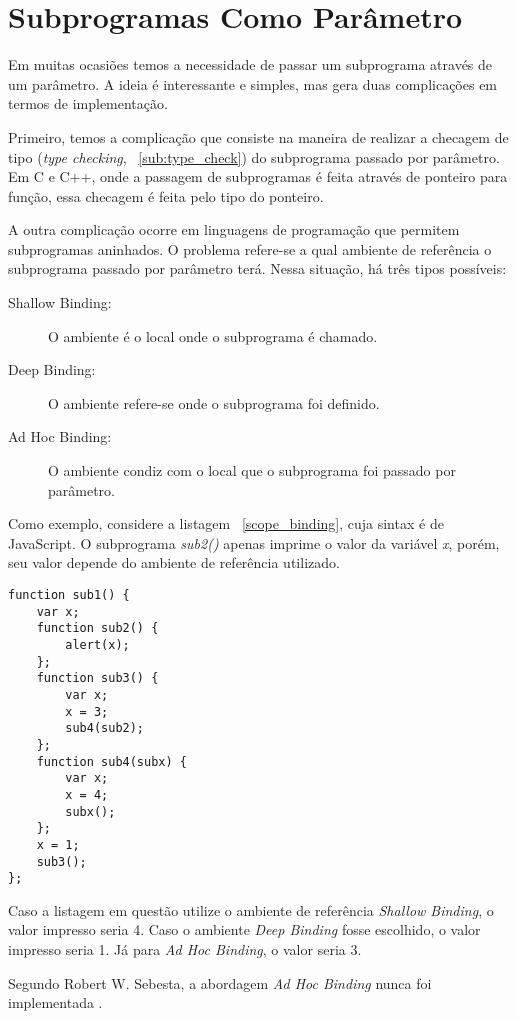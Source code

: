 
\section{Subprogramas Como Parâmetro} %
\label{sec:subprogramas_como_parametro}
Em muitas ocasiões temos a necessidade de passar um subprograma através de um parâmetro. A ideia é interessante e simples, mas gera duas complicações em termos de implementação.

Primeiro, temos a complicação que consiste na maneira de realizar a checagem de tipo (\textit{type checking}, ~\ref{sub:type_check}) do subprograma passado por parâmetro. Em C e C++, onde a passagem de subprogramas é feita através de ponteiro para função, essa checagem é feita pelo tipo do ponteiro.

A outra complicação ocorre em linguagens de programação que permitem subprogramas aninhados. O problema refere-se a qual ambiente de referência o subprograma passado por parâmetro terá. Nessa situação, há três tipos possíveis:
\begin{description}
	\item[Shallow Binding:] O ambiente é o local onde o subprograma é chamado.
	\item[Deep Binding:] O ambiente refere-se onde o subprograma foi definido.
	\item[Ad Hoc Binding:] O ambiente condiz com o local que o subprograma foi passado por parâmetro.
\end{description}

Como exemplo, considere a listagem ~\ref{scope_binding}, cuja sintax é de JavaScript. O subprograma \textit{sub2()} apenas imprime o valor da variável \textit{x}, porém, seu valor depende do ambiente de referência utilizado. 

\begin{lstlisting}[caption=Código retirado de \cite{sebesta}]
function sub1() {
	var x;
	function sub2() {
		alert(x);
	};
	function sub3() {
		var x;
		x = 3;
		sub4(sub2);
	};
	function sub4(subx) {
		var x;
		x = 4;
		subx();
	};
	x = 1;
	sub3();
};
\end{lstlisting}
\label{scope_binding}

Caso a listagem em questão utilize o ambiente de referência \textit{Shallow Binding}, o valor impresso seria 4. Caso o ambiente \textit{Deep Binding} fosse escolhido, o valor impresso seria 1. Já para \textit{Ad Hoc Binding}, o valor seria 3.

Segundo Robert W. Sebesta, a abordagem \textit{Ad Hoc Binding} nunca foi implementada \cite{sebesta}.
